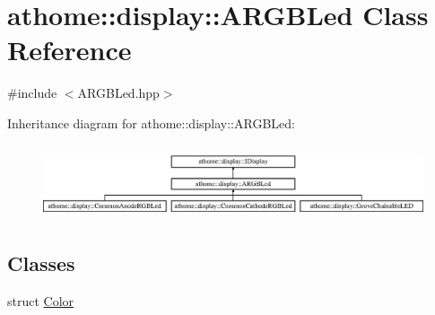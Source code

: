 \hypertarget{classathome_1_1display_1_1_a_r_g_b_led}{}\section{athome\+:\+:display\+:\+:A\+R\+G\+B\+Led Class Reference}
\label{classathome_1_1display_1_1_a_r_g_b_led}


{\ttfamily \#include $<$A\+R\+G\+B\+Led.\+hpp$>$}

Inheritance diagram for athome\+:\+:display\+:\+:A\+R\+G\+B\+Led\+:\begin{figure}[H]
\begin{center}
\leavevmode
\includegraphics[height=2.213439cm]{classathome_1_1display_1_1_a_r_g_b_led}
\end{center}
\end{figure}
\subsection*{Classes}
\begin{DoxyCompactItemize}
\item 
struct \mbox{\hyperlink{structathome_1_1display_1_1_a_r_g_b_led_1_1_color}{Color}}
\end{DoxyCompactItemize}
